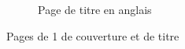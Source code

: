 \begin{landscape}
\begin{figure}[htb]
\begin{subfigure}[b]{.45\linewidth}
      \caption{Page de titre en anglais}
      \label{fig-maketitle-en}
    \end{subfigure}%
    \caption{Pages de 1\iere{} de couverture et de titre}
    \label{fig-maketitle}
  \end{figure}
\end{landscape}

